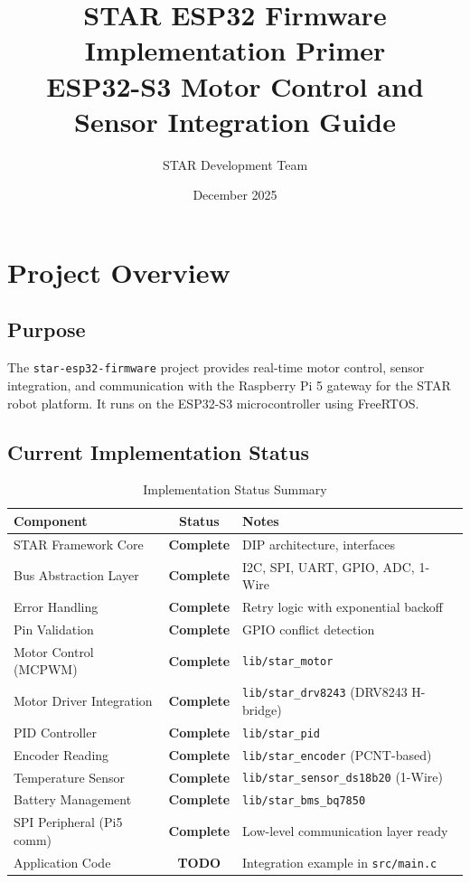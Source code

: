 \documentclass[11pt,letterpaper]{article}
\title{\textbf{STAR ESP32 Firmware Implementation Primer}\\[0.5cm]
\large ESP32-S3 Motor Control and Sensor Integration Guide}
\author{STAR Development Team}
\date{December 2025}
\begin{document}
\maketitle
\tableofcontents
\newpage

\section{Project Overview}

\subsection{Purpose}

The \texttt{star-esp32-firmware} project provides real-time motor control, sensor integration, and communication with the Raspberry Pi 5 gateway for the STAR robot platform. It runs on the ESP32-S3 microcontroller using FreeRTOS.

\subsection{Current Implementation Status}

\begin{table}[H]
\centering
\begin{tabular}{|l|c|l|}
\hline
\textbf{Component} & \textbf{Status} & \textbf{Notes} \\
\hline
STAR Framework Core & \textbf{Complete} & DIP architecture, interfaces \\
Bus Abstraction Layer & \textbf{Complete} & I2C, SPI, UART, GPIO, ADC, 1-Wire \\
Error Handling & \textbf{Complete} & Retry logic with exponential backoff \\
Pin Validation & \textbf{Complete} & GPIO conflict detection \\
\hline
Motor Control (MCPWM) & \textbf{Complete} & \texttt{lib/star\_motor} \\
Motor Driver Integration & \textbf{Complete} & \texttt{lib/star\_drv8243} (DRV8243 H-bridge) \\
PID Controller & \textbf{Complete} & \texttt{lib/star\_pid} \\
Encoder Reading & \textbf{Complete} & \texttt{lib/star\_encoder} (PCNT-based) \\
Temperature Sensor & \textbf{Complete} & \texttt{lib/star\_sensor\_ds18b20} (1-Wire) \\
Battery Management & \textbf{Complete} & \texttt{lib/star\_bms\_bq7850} \\
\hline
SPI Peripheral (Pi5 comm) & \textbf{Complete} & Low-level communication layer ready \\
Application Code & \textbf{TODO} & Integration example in \texttt{src/main.c} \\
\hline
\end{tabular}
\caption{Implementation Status Summary}
\end{table}
\end{document}
